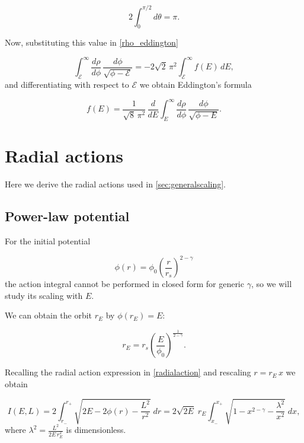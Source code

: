 \begin{equation}
    2\int_0^{\pi/2} d\theta = \pi.
\end{equation}

Now, substituting this value in \cref{rho_eddington}

\begin{equation}
\int_{\mathcal{E}}^{\infty} \frac{d\rho}{d\phi}\,
\frac{d\phi}{\sqrt{\phi-\mathcal{E}}}
= -2\sqrt{2}\,\pi^2 \int_{\mathcal{E}}^{\infty} f(E)\, dE ,
\end{equation}
and differentiating with respect to $\mathcal{E}$ we obtain Eddington's
formula 

\begin{equation}
f(E)
= \frac{1}{\sqrt{8}\,\pi^2}\,
\frac{d}{dE} \int_{E}^{\infty} \frac{d\rho}{d\phi}\,
\frac{d\phi}{\sqrt{\phi-E}} .
\label{eq:app_eddington}
\end{equation}



\section{Radial actions}
\label{app:actions}

Here we derive the radial actions used in \cref{sec:generalscaling}.

\subsection*{Power-law potential}

For the initial potential

\begin{equation}
    \phi(r) = \phi_0 \left( \frac{r}{r_s} \right)^{2-\gamma}
\end{equation}
the action integral cannot be performed in closed form for generic $\gamma$, 
so we will study its scaling with $E$.

We can obtain the orbit $r_E$ by $\phi(r_E) = E$:

\begin{equation}
    r_E = r_s \left( \frac{E}{\phi_0} \right)^{\frac{1}{2-\gamma}}.
\end{equation}

Recalling the radial action expression in \cref{radialaction}
and rescaling $r = r_E\, x$ we obtain

\begin{equation}
I(E,L)
= 2 \int_{r_-}^{r_+} \sqrt{2E - 2\phi(r) - \frac{L^2}{r^2}}\; dr
= 2\sqrt{2E}\; r_E \int_{x_-}^{x_+}
\sqrt{1 - x^{2-\gamma} - \frac{\lambda^2}{x^2}}\; dx ,
\end{equation}
where $\lambda^2 = \frac{L^2}{2E\, r_E^2}$ is dimensionless.

